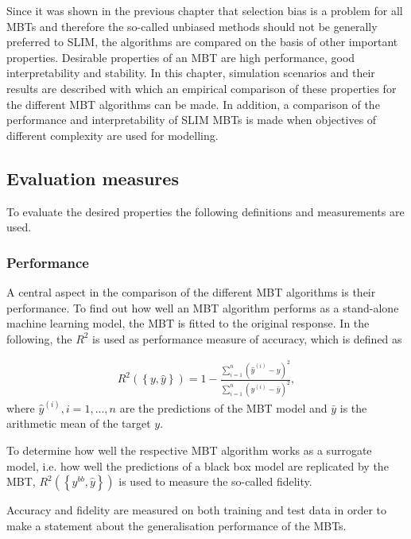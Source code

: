 Since it was shown in the previous chapter that selection bias is a problem for all MBTs and therefore the so-called unbiased methods should not be generally preferred to SLIM, the algorithms are compared on the basis of other important properties.
Desirable properties of an MBT are high performance, good interpretability and stability.
In this chapter, simulation scenarios and their results are described with which an empirical comparison of these properties for the different MBT algorithms can be made.
In addition, a comparison of the performance and interpretability of SLIM MBTs is made when objectives of different complexity are used for modelling.

\subsection{Evaluation measures}
To evaluate the desired properties the following definitions and measurements are used.

\subsubsection{Performance}
A central aspect in the comparison of the different MBT algorithms is their performance. 
To find out how well an MBT algorithm performs as a stand-alone machine learning model, the MBT is fitted to the original response. 
In the following, the $R^2$ is used as performance measure of accuracy, which is defined as

\begin{align}
    R^2\left( \left\{y, \hat{y}\right\}\right) = 1-\frac{\sum_{i = 1}^{n}\left(\hat{y}^{(i) } - y\right)^2}{\sum_{i = 1}^{n}\left(y^{(i)} - \bar{y}\right)^2},
\end{align}
where $\hat{y}^{(i)}, i = 1,...,n$ are the predictions of the MBT model and $\bar{y}$ is the arithmetic mean of the target $y$.

To determine how well the respective MBT algorithm works as a surrogate model, i.e. how well the predictions of a black box model are replicated by the MBT, $R^2\left( \left\{y^{bb}, \hat{y}\right\}\right)$ is used to measure the so-called fidelity. 

Accuracy and fidelity are measured on both training and test data in order to make a statement about the generalisation performance of the MBTs.

\vspace{0.5cm}
